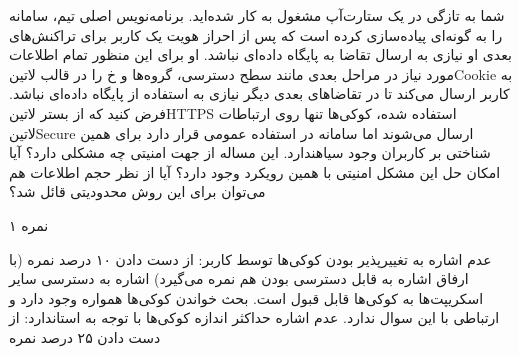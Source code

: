 \documentclass[../main.tex]{subfiles}
\begin{document}

شما به تازگی در یک ستارت‌آپ مشغول به کار شده‌اید.
برنامه‌نویس اصلی تیم، سامانه را به گونه‌ای پیاده‌سازی کرده است که پس از احراز هویت یک کاربر
برای تراکنش‌های بعدی او نیازی به ارسال تقاضا به پایگاه داده‌ای نباشد.
او برای این منظور تمام اطلاعات مورد نیاز در مراحل بعدی مانند سطح دسترسی، گروه‌ها و ‌خ را در قالب ‌لاتین{Cookie}
به کاربر ارسال می‌کند تا در تقاضاهای بعدی دیگر نیازی به استفاده از پایگاه داده‌ای نباشد.
فرض کنید که از بستر ‌لاتین{HTTPS} استفاده شده، کوکی‌ها تنها روی ارتباطات  لاتین{Secure} ارسال می‌شوند اما سامانه در استفاده عمومی قرار دارد برای همین شناختی بر کاربران وجود ‌سیاه{ندارد}.
این مساله از جهت امنیتی چه مشکلی دارد؟ آیا امکان حل این مشکل امنیتی با همین رویکرد وجود دارد؟
آیا از نظر حجم اطلاعات هم می‌توان برای این روش محدودیتی قائل شد؟

۱ نمره

\begin{answer}
 عدم اشاره به تغییرپذیر بودن کوکی‌ها توسط کاربر: از دست دادن ۱۰ درصد نمره (با ارفاق اشاره به قابل دسترسی بودن هم نمره می‌گیرد)
 اشاره به دسترسی سایر اسکریپت‌ها به کوکی‌ها قابل قبول است.
 بحث خواندن کوکی‌ها همواره وجود دارد و ارتباطی با این سوال ندارد.
 عدم اشاره حداکثر اندازه کوکی‌ها با توجه به استاندارد: از دست دادن ۲۵ درصد نمره
\end{answer}
\end{document}
